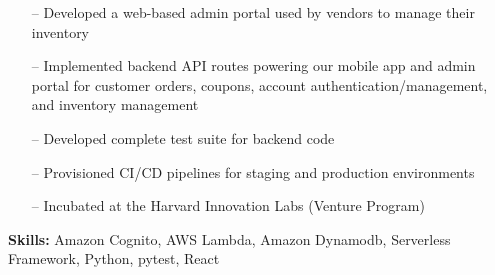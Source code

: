 
\medskip


\begin{itemize}
    \setlength{\itemindent}{0.5em}
    \item[--] Developed a web-based admin portal used by vendors to manage their inventory
    \item[--] Implemented backend API routes powering our mobile app and admin portal for customer orders, coupons, account authentication/management, and inventory management
    \item[--] Developed complete test suite for backend code
    \item[--] Provisioned CI/CD pipelines for staging and production environments
    \item[--] Incubated at the Harvard Innovation Labs (Venture Program)
\end{itemize}

\smallskip

\textbf{Skills:} Amazon Cognito, AWS Lambda, Amazon Dynamodb, Serverless Framework, Python, pytest, React





